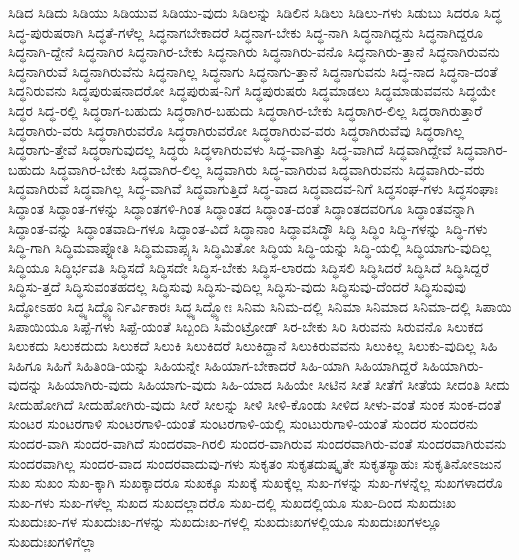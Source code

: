 {ಸಿಡಿದ
ಸಿಡಿದು
ಸಿಡಿಯು
ಸಿಡಿಯುವ
ಸಿಡಿಯು-ವುದು
ಸಿಡಿಲನ್ನು
ಸಿಡಿಲಿನ
ಸಿಡಿಲು
ಸಿಡಿಲು-ಗಳು
ಸಿಡುಬು
ಸಿದರೂ
ಸಿದ್ಧ
ಸಿದ್ಧ-ಪುರುಷರಾಗಿ
ಸಿದ್ಧತೆ-ಗಳೆಲ್ಲ
ಸಿದ್ಧನಾಗಬೇಕಾದರೆ
ಸಿದ್ಧನಾಗ-ಬೇಕು
ಸಿದ್ಧ-ನಾಗಿ
ಸಿದ್ಧನಾಗಿದ್ದನು
ಸಿದ್ಧನಾಗಿದ್ದರೂ
ಸಿದ್ಧನಾಗಿ-ದ್ದೇನೆ
ಸಿದ್ಧನಾಗಿರ
ಸಿದ್ಧನಾಗಿರ-ಬೇಕು
ಸಿದ್ಧನಾಗಿರು
ಸಿದ್ಧನಾಗಿರು-ವನೊ
ಸಿದ್ಧನಾಗಿರು-ತ್ತಾನೆ
ಸಿದ್ಧನಾಗಿರುವನು
ಸಿದ್ಧನಾಗಿರುವೆ
ಸಿದ್ಧನಾಗಿರುವೆನು
ಸಿದ್ಧನಾಗಿಲ್ಲ
ಸಿದ್ಧನಾಗು
ಸಿದ್ಧನಾಗು-ತ್ತಾನೆ
ಸಿದ್ಧನಾಗುವನು
ಸಿದ್ಧ-ನಾದ
ಸಿದ್ಧನಾ-ದಂತೆ
ಸಿದ್ಧನಿರುವನು
ಸಿದ್ಧಪುರುಷನಾದರೋ
ಸಿದ್ಧಪುರುಷ-ನಿಗೆ
ಸಿದ್ಧಪುರುಷರು
ಸಿದ್ಧಮಾಡಲು
ಸಿದ್ಧಮಾಡುವವನು
ಸಿದ್ಧಯೇ
ಸಿದ್ಧರ
ಸಿದ್ಧ-ರಲ್ಲಿ
ಸಿದ್ಧರಾಗ-ಬಹುದು
ಸಿದ್ಧರಾಗಿರ-ಬಹುದು
ಸಿದ್ಧರಾಗಿರ-ಬೇಕು
ಸಿದ್ಧರಾಗಿರ-ಲಿಲ್ಲ
ಸಿದ್ಧರಾಗಿರುತ್ತಾರೆ
ಸಿದ್ಧರಾಗಿರು-ವರು
ಸಿದ್ಧರಾಗಿರುವರೊ
ಸಿದ್ಧರಾಗಿರುವರೋ
ಸಿದ್ಧರಾಗಿರುವ-ವರು
ಸಿದ್ಧರಾಗಿರುವೆವು
ಸಿದ್ಧರಾಗಿಲ್ಲ
ಸಿದ್ಧರಾಗು-ತ್ತೇವೆ
ಸಿದ್ಧರಾಗುವುದಲ್ಲ
ಸಿದ್ಧರು
ಸಿದ್ಧಳಾಗಿರುವಳು
ಸಿದ್ಧ-ವಾಗಿತ್ತು
ಸಿದ್ಧ-ವಾಗಿದೆ
ಸಿದ್ಧವಾಗಿದ್ದೇವೆ
ಸಿದ್ಧವಾಗಿರ-ಬಹುದು
ಸಿದ್ಧವಾಗಿರ-ಬೇಕು
ಸಿದ್ಧವಾಗಿರ-ಲಿಲ್ಲ
ಸಿದ್ಧವಾಗಿರು
ಸಿದ್ಧ-ವಾಗಿರುವ
ಸಿದ್ಧವಾಗಿರುವನು
ಸಿದ್ಧವಾಗಿರು-ವರು
ಸಿದ್ಧವಾಗಿರುವೆ
ಸಿದ್ಧವಾಗಿಲ್ಲ
ಸಿದ್ಧ-ವಾಗಿವೆ
ಸಿದ್ಧವಾಗುತ್ತಿದೆ
ಸಿದ್ಧ-ವಾದ
ಸಿದ್ಧವಾದವ-ನಿಗೆ
ಸಿದ್ಧಸಂಘ-ಗಳು
ಸಿದ್ಧಸಂಘಾಃ
ಸಿದ್ಧಾಂತ
ಸಿದ್ಧಾಂತ-ಗಳನ್ನು
ಸಿದ್ಧಾಂತಗಳಿ-ಗಿಂತ
ಸಿದ್ಧಾಂತದ
ಸಿದ್ಧಾಂತ-ದಂತೆ
ಸಿದ್ಧಾಂತದವರಿಗೂ
ಸಿದ್ಧಾಂತವನ್ನಾಗಿ
ಸಿದ್ಧಾಂತ-ವನ್ನು
ಸಿದ್ಧಾಂತವಾದಿ-ಗಳೂ
ಸಿದ್ಧಾಂತ-ವಿದೆ
ಸಿದ್ಧಾನಾಂ
ಸಿದ್ಧಾವಸಿದ್ಧೌ
ಸಿದ್ಧಿ
ಸಿದ್ಧಿಂ
ಸಿದ್ಧಿ-ಗಳನ್ನು
ಸಿದ್ಧಿ-ಗಳು
ಸಿದ್ಧಿ-ಗಾಗಿ
ಸಿದ್ಧಿಮವಾಪ್ನೋತಿ
ಸಿದ್ಧಿಮವಾಪ್ಸ್ಯಸಿ
ಸಿದ್ಧಿಮಿತೋ
ಸಿದ್ಧಿಯ
ಸಿದ್ಧಿ-ಯನ್ನು
ಸಿದ್ಧಿ-ಯಲ್ಲಿ
ಸಿದ್ಧಿಯಾಗು-ವುದಿಲ್ಲ
ಸಿದ್ಧಿಯೂ
ಸಿದ್ಧಿರ್ಭವತಿ
ಸಿದ್ಧಿಸದೆ
ಸಿದ್ಧಿಸದೇ
ಸಿದ್ಧಿಸ-ಬೇಕು
ಸಿದ್ಧಿಸ-ಲಾರದು
ಸಿದ್ಧಿಸಲಿ
ಸಿದ್ಧಿಸಿದರೆ
ಸಿದ್ಧಿಸಿದೆ
ಸಿದ್ಧಿಸಿದ್ದರೆ
ಸಿದ್ಧಿಸು-ತ್ತದೆ
ಸಿದ್ಧಿಸುವಂತಹದಲ್ಲ
ಸಿದ್ಧಿಸುವು
ಸಿದ್ಧಿಸು-ವುದಿಲ್ಲ
ಸಿದ್ಧಿಸು-ವುದು
ಸಿದ್ಧಿಸುವು-ದೆಂದರೆ
ಸಿದ್ಧಿಸುವುವು
ಸಿದ್ಧೋಽಹಂ
ಸಿದ್ಧ್ಯಸಿದ್ಧ್ಯೊರ್ನಿರ್ವಿಕಾರಃ
ಸಿದ್ಧ್ಯಸಿದ್ಧ್ಯೋಃ
ಸಿನಿಮ
ಸಿನಿಮ-ದಲ್ಲಿ
ಸಿನಿಮಾ
ಸಿನಿಮಾದ
ಸಿನಿಮಾ-ದಲ್ಲಿ
ಸಿಪಾಯಿ
ಸಿಪಾಯಿಯೂ
ಸಿಪ್ಪೆ-ಗಳು
ಸಿಪ್ಪೆ-ಯಂತೆ
ಸಿಬ್ಬಂದಿ
ಸಿಮೆಂಟ್ರೋಡ್
ಸಿರ-ಬೇಕು
ಸಿರಿ
ಸಿರುವನು
ಸಿರುವನೊ
ಸಿಲುಕದ
ಸಿಲುಕದು
ಸಿಲುಕದುದು
ಸಿಲುಕದೆ
ಸಿಲುಕಿ
ಸಿಲುಕಿದರೆ
ಸಿಲುಕಿದ್ದಾನೆ
ಸಿಲುಕಿರುವವನು
ಸಿಲುಕಿಲ್ಲ
ಸಿಲುಕು-ವುದಿಲ್ಲ
ಸಿಹಿ
ಸಿಹಿಗೂ
ಸಿಹಿಗೆ
ಸಿಹಿತಿಂಡಿ-ಯನ್ನು
ಸಿಹಿಯನ್ನೇ
ಸಿಹಿಯಾಗ-ಬೇಕಾದರೆ
ಸಿಹಿ-ಯಾಗಿ
ಸಿಹಿಯಾಗಿದ್ದರೆ
ಸಿಹಿಯಾಗಿರು-ವುದನ್ನು
ಸಿಹಿಯಾಗಿರು-ವುದು
ಸಿಹಿಯಾಗು-ವುದು
ಸಿಹಿ-ಯಾದ
ಸಿಹಿಯೇ
ಸೀಟಿನ
ಸೀತೆ
ಸೀತೆಗೆ
ಸೀತೆಯ
ಸೀದಂತಿ
ಸೀದು
ಸೀದುಹೋಗಿದೆ
ಸೀದುಹೋಗಿರು-ವುದು
ಸೀರೆ
ಸೀಲನ್ನು
ಸೀಳಿ
ಸೀಳಿ-ಕೊಂಡು
ಸೀಳಿದ
ಸೀಳು-ವಂತೆ
ಸುಂಕ
ಸುಂಕ-ದಂತೆ
ಸುಂಟರ
ಸುಂಟರಗಾಳಿ
ಸುಂಟರಗಾಳಿ-ಯಂತೆ
ಸುಂಟರಗಾಳಿ-ಯಲ್ಲಿ
ಸುಂಟುರುಗಾಳಿ-ಯಂತೆ
ಸುಂದರ
ಸುಂದರನು
ಸುಂದರ-ವಾಗಿ
ಸುಂದರ-ವಾಗಿದೆ
ಸುಂದರವಾ-ಗಿರಲಿ
ಸುಂದರ-ವಾಗಿರುವ
ಸುಂದರವಾಗಿರು-ವಂತೆ
ಸುಂದರವಾಗಿರುವನು
ಸುಂದರವಾಗಿಲ್ಲ
ಸುಂದರ-ವಾದ
ಸುಂದರವಾದುವು-ಗಳು
ಸುಕೃತಂ
ಸುಕೃತದುಷ್ಕೃತೇ
ಸುಕೃತಸ್ಯಾಹುಃ
ಸುಕೃತಿನೋಽಜುನ
ಸುಖ
ಸುಖಂ
ಸುಖ-ಕ್ಕಾಗಿ
ಸುಖಕ್ಕಾದರೂ
ಸುಖಕ್ಕೂ
ಸುಖಕ್ಕೆ
ಸುಖಕ್ಕೆಲ್ಲ
ಸುಖ-ಗಳನ್ನು
ಸುಖ-ಗಳನ್ನೆಲ್ಲ
ಸುಖಗಳಾದರೊ
ಸುಖ-ಗಳು
ಸುಖ-ಗಳೆಲ್ಲ
ಸುಖದ
ಸುಖದಲ್ಲಾದರೊ
ಸುಖ-ದಲ್ಲಿ
ಸುಖದಲ್ಲಿಯೂ
ಸುಖ-ದಿಂದ
ಸುಖದುಃಖ
ಸುಖದುಃಖ-ಗಳ
ಸುಖದುಃಖ-ಗಳನ್ನು
ಸುಖದುಃಖ-ಗಳಲ್ಲಿ
ಸುಖದುಃಖಗಳಲ್ಲಿಯೂ
ಸುಖದುಃಖಗಳಲ್ಲೂ
ಸುಖದುಃಖಗಳಿಗೆಲ್ಲಾ
}

